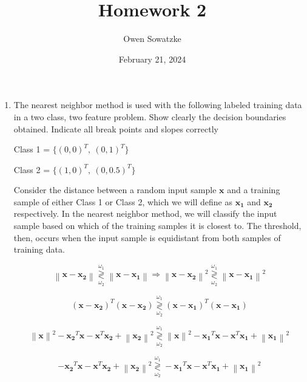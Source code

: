 \documentclass[fleqn]{article}
\title{Homework 2}
\author{Owen Sowatzke}
\date{February 21, 2024}
\newcommand{\zerodisplayskip}{
	\setlength{\abovedisplayskip}{0pt}%
	\setlength{\belowdisplayskip}{0pt}%
	\setlength{\abovedisplayshortskip}{0pt}%
	\setlength{\belowdisplayshortskip}{0pt}%
	\setlength{\mathindent}{0pt}}
\newcommand{\norm}[1]{\left \lVert #1 \right \rVert}
\begin{document}
	\offinterlineskip
	\setlength{\lineskip}{12pt}
	\zerodisplayskip
	\maketitle
	
	\begin{enumerate}
		\item  The nearest neighbor method is used with the following labeled training data in a two class, two feature problem. Show clearly the decision boundaries obtained. Indicate all break points and slopes correctly
		
		Class 1 = $\{(0,0)^T,\:(0,1)^T\}$
		
		Class 2 = $\{(1,0)^T,\:(0,0.5)^T\}$
		
		Consider the distance between a random input sample $\mathbf{x}$ and a training sample of either Class 1 or Class 2, which we will define as $\mathbf{x_1}$ and $\mathbf{x_2}$ respectively. In the nearest neighbor method, we will classify the input sample based on which of the training samples it is closest to. The threshold, then, occurs when the input sample is equidistant from both samples of training data.
		
		\begin{equation*}
			\norm{\mathbf{x} - \mathbf{x_2}} \overset{\omega_1}{\underset{\omega_2}{\gtrless}} \norm{\mathbf{x} - \mathbf{x_1}} \Rightarrow \norm{\mathbf{x} - \mathbf{x_2}}^2  \overset{\omega_1}{\underset{\omega_2}{\gtrless}} \norm{\mathbf{x} - \mathbf{x_1}}^2
		\end{equation*}
		
		\begin{equation*}
			(\mathbf{x} - \mathbf{x_2})^T(\mathbf{x} - \mathbf{x_2}) \overset{\omega_1}{\underset{\omega_2}{\gtrless}} (\mathbf{x} - \mathbf{x_1})^T(\mathbf{x} - \mathbf{x_1})
		\end{equation*}
		
		\begin{equation*}
			\norm{\mathbf{x}}^2 - \mathbf{x_2}^T\mathbf{x} - \mathbf{x}^T\mathbf{x_2} + \norm{\mathbf{x_2}}^2 \overset{\omega_1}{\underset{\omega_2}{\gtrless}} \norm{\mathbf{x}}^2 - \mathbf{x_1}^T\mathbf{x} - \mathbf{x}^T\mathbf{x_1} + \norm{\mathbf{x_1}}^2
		\end{equation*}
		
		\begin{equation*}
			- \mathbf{x_2}^T\mathbf{x} - \mathbf{x}^T\mathbf{x_2} + \norm{\mathbf{x_2}}^2 \overset{\omega_1}{\underset{\omega_2}{\gtrless}} - \mathbf{x_1}^T\mathbf{x} - \mathbf{x}^T\mathbf{x_1} + \norm{\mathbf{x_1}}^2
		\end{equation*}
		

\end{enumerate}
\end{document}
